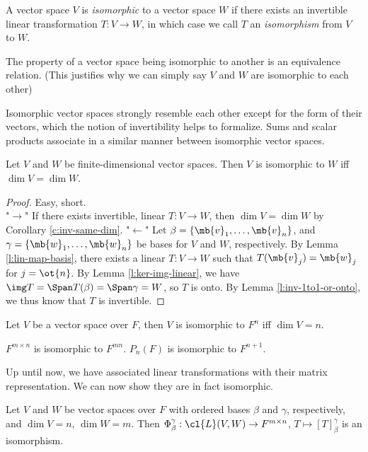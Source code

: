 \begin{defn}
A vector space $V$ is \emph{isomorphic} to a vector space $W$ if there exists an invertible linear transformation $T:V \to W$, in which case we call $T$ an \emph{isomorphism} from $V$ to $W$.
\end{defn}
\begin{exer}
The property of a vector space being isomorphic to another is an equivalence relation. (This justifies why we can simply say $V$ and $W$ are isomorphic to each other)
\end{exer}
Isomorphic vector spaces strongly resemble each other except for the form of their vectors, which the notion of invertibility helps to formalize. Sums and scalar products associate in a similar manner between isomorphic vector spaces.
\begin{lem}\label{l:isomorphic-same-dim}
Let $V$ and $W$ be finite-dimensional vector spaces. Then $V$ is isomorphic to $W$ iff $\dim V= \dim W$.
\end{lem}
\begin{proof}
Easy, short.\\
"$\to$" If there exists invertible, linear $T:V \to W$, then $\dim V= \dim W$ by Corollary \ref{c:inv-same-dim}.
"$\leftarrow$" Let $\beta= \{ \mb{v}_1, \ldots, \mb{v}_n\}$, and $\gamma= \{ \mb{w}_1, \ldots, \mb{w}_n \}$ be bases for $V$ and $W$, respectively. By Lemma \ref{l:lin-map-basis}, there exists a linear $T:V \to W$ such that $T( \mb{v}_j)= \mb{w}_j$ for $j=\ot{n}$.
By Lemma \ref{l:ker-img-linear}, we have $\img T= \Span T( \beta)= \Span \gamma =W$, so $T$ is onto. By Lemma \ref{l:inv-1to1-or-onto}, we thus know that $T$ is invertible.
\end{proof}
\begin{corollary}
Let $V$ be a vector space over $F$, then $V$ is isomorphic to $F^n$ iff $\dim V=n$.
\end{corollary}
\begin{example}
$F^{m \times n}$ is isomorphic to $F^{mn}$. $P_n(F)$ is isomorphic to $F^{n+1}$.
\end{example}
Up until now, we have associated linear transformations with their matrix representation. We can now show they are in fact isomorphic.
\begin{prop}\label{p:iso-linear-map-mat}
Let $V$ and $W$ be vector spaces over $F$ with ordered bases $\beta$ and $\gamma$, respectively, and $\dim V=n$, $\dim W=m$. Then $\Phi_\beta^\gamma: \cl{L}(V,W) \to F^{m \times n}$, $T \mapsto [T]_\beta^\gamma$ is an isomorphism.
\end{prop}
